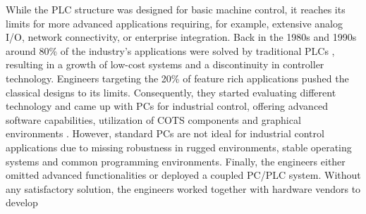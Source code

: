 While the \ac{PLC} structure was designed for basic machine control, it
reaches its limits for more advanced applications requiring, for example,
extensive analog I/O, network connectivity, or enterprise integration. Back in
the 1980s and 1990s around 80\% of the industry's applications were solved by
traditional \acp{PLC} \citep{bel05}, resulting in a growth of low-cost systems
and a discontinuity in controller technology. Engineers targeting the 20\% of
feature rich applications pushed the classical designs to its limits.
Consequently, they started evaluating different technology and came up with
\acp{PC} for industrial control, offering advanced software capabilities,
utilization of \ac{COTS} components and graphical environments \citep{bel05}.
However, standard \acp{PC} are not ideal for industrial control applications
due to missing robustness in rugged environments, stable operating systems and
common programming environments. Finally, the engineers either omitted
advanced functionalities or deployed a coupled \ac{PC}/\ac{PLC} system.
Without any satisfactory solution, the engineers worked together with hardware
vendors to develop

